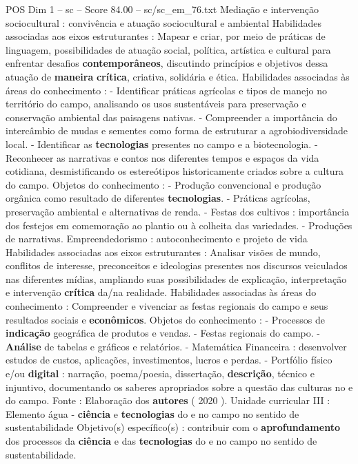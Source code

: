 \begin{textsample}{POS Dim 1 – sc – Score 84.00 – sc/sc\_em\_76.txt}
Mediação e intervenção sociocultural : convivência e atuação sociocultural e ambiental Habilidades associadas aos eixos estruturantes : Mapear e criar, por meio de práticas de linguagem, possibilidades de atuação social, política, artística e cultural para enfrentar desafios \textbf{contemporâneos}, discutindo princípios e objetivos dessa atuação de \textbf{maneira} \textbf{crítica}, criativa, solidária e ética.
Habilidades associadas às áreas do conhecimento : - Identificar práticas agrícolas e tipos de manejo no território do campo, analisando os usos sustentáveis para preservação e conservação ambiental das paisagens nativas. - Compreender a importância do intercâmbio de mudas e sementes como forma de estruturar a agrobiodiversidade local. - Identificar as \textbf{tecnologias} presentes no campo e a biotecnologia. - Reconhecer as narrativas e contos nos diferentes tempos e espaços da vida cotidiana, desmistificando os estereótipos historicamente criados sobre a cultura do campo.
Objetos do conhecimento : - Produção convencional e produção orgânica como resultado de diferentes \textbf{tecnologias}. - Práticas agrícolas, preservação ambiental e alternativas de renda. - Festas dos cultivos : importância dos festejos em comemoração ao plantio ou à colheita das variedades. - Produções de narrativas.
Empreendedorismo : autoconhecimento e projeto de vida Habilidades associadas aos eixos estruturantes : Analisar visões de mundo, conflitos de interesse, preconceitos e ideologias presentes nos discursos veiculados nas diferentes mídias, ampliando suas possibilidades de explicação, interpretação e intervenção \textbf{crítica} da/na realidade.
Habilidades associadas às áreas do conhecimento : Compreender e vivenciar as festas regionais do campo e seus resultados sociais e \textbf{econômicos}.
Objetos do conhecimento : - Processos de \textbf{indicação} geográfica de produtos e vendas. - Festas regionais do campo. - \textbf{Análise} de tabelas e gráficos e relatórios. - Matemática Financeira : desenvolver estudos de custos, aplicações, investimentos, lucros e perdas. - Portfólio físico e/ou \textbf{digital} : narração, poema/poesia, dissertação, \textbf{descrição}, técnico e injuntivo, documentando os saberes apropriados sobre a questão das culturas no e do campo.
Fonte : Elaboração dos \textbf{autores} ( 2020 ).
Unidade curricular III : Elemento água - \textbf{ciência} e \textbf{tecnologias} do e no campo no sentido de sustentabilidade Objetivo(s) específico(s) : contribuir com o \textbf{aprofundamento} dos processos da \textbf{ciência} e das \textbf{tecnologias} do e no campo no sentido de sustentabilidade.

\end{textsample}
